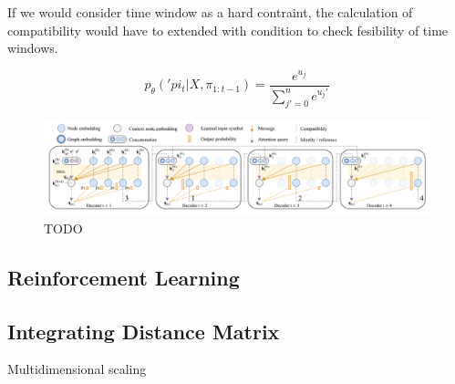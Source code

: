     If we would consider time window as a hard contraint, the calculation of compatibility would have to extended with condition to check fesibility of time windows.
  
    \begin{equation}\label{encoder-attention-score}
        p_{\theta}('pi_t|X, \pi_{1:t-1}) = \dfrac{e^{u_j}}{\sum_{j'=0}^n e^{u_j'}}
    \end{equation}
    
    \begin{figure}[ht]
        \centering
        \includegraphics[width=1.0\textwidth]{resources/vrptw-ai/decoder-diagram.png}
        \caption{TODO \cite{attention-route}}
        \label{fig:encoder-diagram}
    \end{figure}
    
    \subsection{Reinforcement Learning}\label{vrptw-rl}
        
    \subsection{Integrating Distance Matrix}
    Multidimensional scaling
